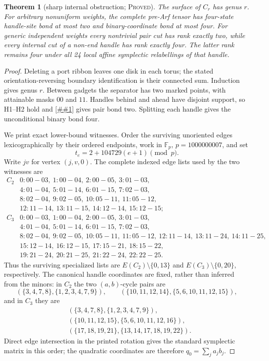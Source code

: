 \documentclass[11pt]{article}
\newcommand{\cref}[1]{\autoref{##1}}%
\newtheorem{theorem}{Theorem}[section]
\newcommand{\claimtag}[1]{\textsc{#1}}
\newcommand{\proved}{\claimtag{Proved}}
\begin{document}
\begin{theorem}[sharp internal obstruction; \proved]\label{thm:k33}
The surface of \(C_r\) has genus \(r\).  For arbitrary nonuniform weights,
the complete pre-Arf tensor has four-state handle-site bond at most two and
binary-coordinate bond at most four.  For generic independent weights every
nontrivial pair cut has rank exactly two, while every internal cut of a
non-end handle has rank exactly four.  The latter rank remains four under all
24 local affine symplectic relabellings of that handle.
\end{theorem}

\begin{proof}
Deleting a port ribbon leaves one disk in each torus; the stated
orientation-reversing boundary identification is their connected sum.
Induction gives genus \(r\).  Between
gadgets the separator has two marked points, with attainable masks \(00\) and
\(11\).  Handles behind and ahead have disjoint support, so H1--H2 hold and
\cref{thm:separator} gives pair bond two.  Splitting each handle gives the
unconditional binary bond four.

We print exact lower-bound witnesses.  Order the surviving unoriented edges
lexicographically by their ordered endpoints, work in
\(\mathbb F_p\), \(p=1000000007\), and set
\[
 t_e=2+104729(e+1)\pmod p.
\]
Write \(jv\) for vertex \((j,v,0)\).  The complete indexed edge lists used
by the two witnesses are
\begingroup\small
\[
\begin{array}{c|l}
C_2&
0:00\!-
03,\ 1:00\!-04,\ 2:00\!-05,\ 3:01\!-03,\\
&4:01\!-04,\ 5:01\!-14,\ 6:01\!-15,\ 7:02\!-03,\\
&8:02\!-04,\ 9:02\!-05,\ 10:05\!-11,\ 11:05\!-12,\\
&12:11\!-14,\ 13:11\!-15,\ 14:12\!-14,\ 15:12\!-15;\\[2pt]
C_3&
0:00\!-03,\ 1:00\!-04,\ 2:00\!-05,\ 3:01\!-03,\\
&4:01\!-04,\ 5:01\!-14,\ 6:01\!-15,\ 7:02\!-03,\\
&8:02\!-04,\ 9:02\!-05,\ 10:05\!-11,\ 11:05\!-12,\
12:11\!-14,\ 13:11\!-24,\ 14:11\!-25,\\
&15:12\!-14,\ 16:12\!-15,\ 17:15\!-21,\ 18:15\!-22,\\
&19:21\!-24,\ 20:21\!-25,\ 21:22\!-24,\ 22:22\!-25.
\end{array}
\]
\endgroup
Thus the surviving specialized lists are
\(E(C_2)\setminus\{0,13\}\) and
\(E(C_3)\setminus\{0,20\}\), respectively.  The canonical handle
coordinates are fixed, rather than inferred from the minors: in \(C_2\) the
two \((a,b)\)-cycle pairs are
\[
 (\{3,4,7,8\},\{1,2,3,4,7,9\}),\qquad
 (\{10,11,12,14\},\{5,6,10,11,12,15\}),
\]
and in \(C_3\) they are
\[
\begin{split}
 &(\{3,4,7,8\},\{1,2,3,4,7,9\}),\\
 &(\{10,11,12,15\},\{5,6,10,11,12,16\}),\\
 &(\{17,18,19,21\},\{13,14,17,18,19,22\}).
\end{split}
\]
Direct edge intersection in the printed rotation gives the standard
symplectic matrix in this order; the quadratic coordinates are therefore
\(q_0=\sum_j a_jb_j\).


\end{proof}
\end{document}
